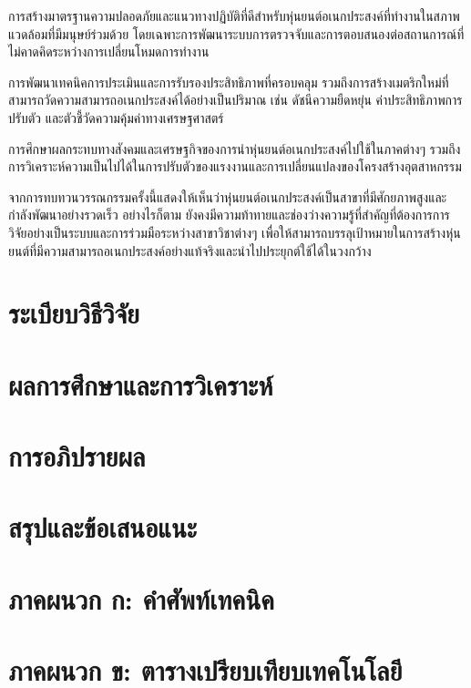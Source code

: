 \documentclass[a4paper]{article}
\begin{document}
การสร้างมาตรฐานความปลอดภัยและแนวทางปฏิบัติที่ดีสำหรับหุ่นยนต์อเนกประสงค์ที่ทำงานในสภาพแวดล้อมที่มีมนุษย์ร่วมด้วย โดยเฉพาะการพัฒนาระบบการตรวจจับและการตอบสนองต่อสถานการณ์ที่ไม่คาดคิดระหว่างการเปลี่ยนโหมดการทำงาน

การพัฒนาเทคนิคการประเมินและการรับรองประสิทธิภาพที่ครอบคลุม รวมถึงการสร้างเมตริกใหม่ที่สามารถวัดความสามารถอเนกประสงค์ได้อย่างเป็นปริมาณ เช่น ดัชนีความยืดหยุ่น ค่าประสิทธิภาพการปรับตัว และตัวชี้วัดความคุ้มค่าทางเศรษฐศาสตร์

การศึกษาผลกระทบทางสังคมและเศรษฐกิจของการนำหุ่นยนต์อเนกประสงค์ไปใช้ในภาคต่างๆ รวมถึงการวิเคราะห์ความเป็นไปได้ในการปรับตัวของแรงงานและการเปลี่ยนแปลงของโครงสร้างอุตสาหกรรม

จากการทบทวนวรรณกรรมครั้งนี้แสดงให้เห็นว่าหุ่นยนต์อเนกประสงค์เป็นสาขาที่มีศักยภาพสูงและกำลังพัฒนาอย่างรวดเร็ว อย่างไรก็ตาม ยังคงมีความท้าทายและช่องว่างความรู้ที่สำคัญที่ต้องการการวิจัยอย่างเป็นระบบและการร่วมมือระหว่างสาขาวิชาต่างๆ เพื่อให้สามารถบรรลุเป้าหมายในการสร้างหุ่นยนต์ที่มีความสามารถอเนกประสงค์อย่างแท้จริงและนำไปประยุกต์ใช้ได้ในวงกว้าง

\section{ระเบียบวิธีวิจัย}

\section{ผลการศึกษาและการวิเคราะห์}

\section{การอภิปรายผล}

\section{สรุปและข้อเสนอแนะ}

\printbibliography[title=เอกสารอ้างอิง]

\appendix

\section{ภาคผนวก ก: คำศัพท์เทคนิค}

\section{ภาคผนวก ข: ตารางเปรียบเทียบเทคโนโลยี}
\end{document}

